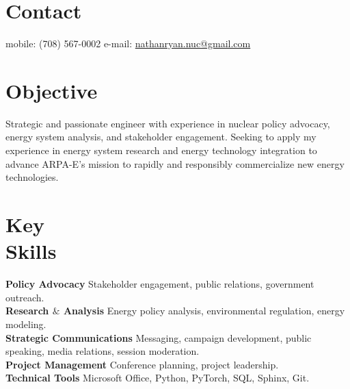 \documentclass[margin,line]{resume}
\begin{document}
\begin{resume}

%


    \section{\mysidestyle Contact}
    mobile: (708) 567-0002 \hfill e-mail: \href{mailto:nathanryan.nuc@gmail.com}{nathanryan.nuc@gmail.com} \hfill \hfill  \hfill \hspace{0mm}\\\vspace{1mm}%

    \vspace{-6mm}
    \section{\mysidestyle Objective}
        Strategic and passionate engineer with experience in nuclear policy advocacy, energy system analysis, and stakeholder engagement. Seeking to apply my experience in energy system research and energy technology integration to advance ARPA-E's mission to rapidly and responsibly commercialize new energy technologies.
    \section{\mysidestyle Key\\Skills}
        \textbf{Policy Advocacy} Stakeholder engagement, public relations, government outreach.\vspace{1mm}\\
        \textbf{Research $\&$ Analysis} Energy policy analysis, environmental regulation, energy modeling.\vspace{1mm}\\
        \textbf{Strategic Communications} Messaging, campaign development, public speaking, media relations, session moderation.\vspace{1mm}\\
        \textbf{Project Management} Conference planning, project leadership.\vspace{1mm}\\
        \textbf{Technical Tools} Microsoft Office, Python, PyTorch, SQL, Sphinx, Git.\vspace{1mm}

\end{resume}
\end{document}
